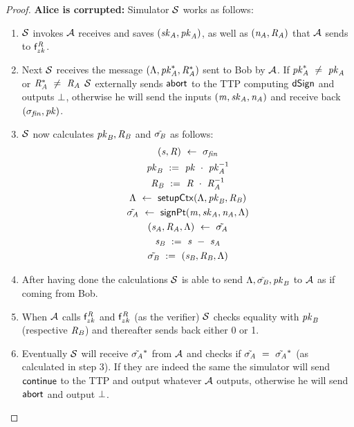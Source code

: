 \begin{proof}
    \textbf{Alice is corrupted: } Simulator $\mathcal{S}$ works as follows:
    \begin{enumerate}
        \item $\mathcal{S}$ invokes $\mathcal{A}$ receives and saves $(\mathit{sk}_{\mathit{A}}, \mathit{pk}_{\mathit{A}})$, as well as $(\mathit{\mathit{n}_{\mathit{A}}}, \mathit{R}_{\mathit{A}})$ that $\mathcal{A}$ sends to $\mathsf{f}^{\mathit{R}}_{zk}$.
        \item Next $\mathcal{S}$ receives the message $(\Lambda, \mathit{pk}_{\mathit{A}}^*, \mathit{R}_{\mathit{A}}^*)$ sent to Bob by $\mathcal{A}$.
        If $\mathit{pk}_{\mathit{A}}^* ~\neq~ \mathit{pk}_{\mathit{A}}$ or $\mathit{R}_{\mathit{A}}^* ~\neq~ \mathit{R}_{\mathit{A}}$ $\mathcal{S}$ externally sends $\mathsf{abort}$ to the TTP computing $\mathsf{dSign}$ and outputs $\bot$, otherwise he will send the inputs $(\mathit{m}, \mathit{sk}_{\mathit{A}}, \mathit{\mathit{n}_{\mathit{A}}})$ and receive back $(\sigma_{\mathit{fin}}, \mathit{pk})$.
        \item $\mathcal{S}$ now calculates $\mathit{pk}_{\mathit{B}}, \mathit{R}_{\mathit{B}}$ and $\tilde{\sigma_{\mathit{B}}}$ as follows:
        \begin{gather*}
            (\mathit{s}, \mathit{R}) ~\leftarrow~ \sigma_{\mathit{fin}} \\
            \mathit{pk}_{\mathit{B}} ~:=~ \mathit{pk} ~\cdot~ \mathit{pk}_{\mathit{A}}^{-1} \\
            \mathit{R}_{\mathit{B}} ~:=~ \mathit{R} ~\cdot~ \mathit{R}_{\mathit{A}}^{-1} \\
            \Lambda ~\leftarrow~ \mathsf{setupCtx}( \Lambda, \mathit{pk}_{\mathit{B}}, \mathit{R}_{\mathit{B}} ) \\
            \tilde{\sigma_{\mathit{A}}} ~\leftarrow~ \mathsf{signPt}(\mathit{m}, \mathit{sk}_{\mathit{A}}, \mathit{\mathit{n}_{\mathit{A}}}, \Lambda) \\
            (\mathit{s}_{\mathit{A}}, \mathit{R}_{\mathit{A}}, \Lambda) ~\leftarrow~ \tilde{\sigma_{\mathit{A}}} \\
            \mathit{s}_{\mathit{B}} ~:=~ \mathit{s} ~-~ \mathit{s}_{\mathit{A}} \\
            \tilde{\sigma_{\mathit{B}}} ~:=~ (\mathit{s}_{\mathit{B}}, \mathit{R}_{\mathit{B}}, \Lambda)
        \end{gather*}
        \item After having done the calculations $\mathcal{S}$ is able to send $\Lambda, \tilde{\sigma_{\mathit{B}}}, \mathit{pk}_{\mathit{B}}$ to $\mathcal{A}$ as if coming from Bob.
        \item When $\mathcal{A}$ calls $\mathsf{f}^{\mathit{R}}_{zk}$ and $\mathsf{f}^{\mathit{R}}_{zk}$ (as the verifier) $\mathcal{S}$ checks equality with $\mathit{pk}_{\mathit{B}}$ (respective $\mathit{R}_{\mathit{B}}$) and thereafter sends back either 0 or 1.
        \item Eventually $\mathcal{S}$ will receive $\tilde{\sigma_{\mathit{A}}}^*$ from $\mathcal{A}$ and checks if $\tilde{\sigma_{\mathit{A}}} ~=~ \tilde{\sigma_{\mathit{A}}}^*$ (as calculated in step 3).
        If they are indeed the same the simulator will send $\mathsf{continue}$ to the TTP and output whatever $\mathcal{A}$ outputs, otherwise he will send $\mathsf{abort}$ and output $\bot$.
    \end{enumerate}


\end{proof}

